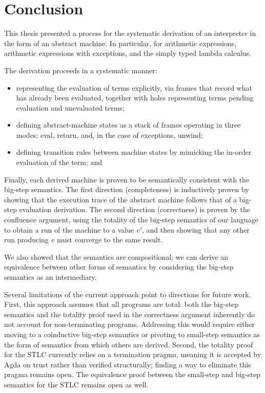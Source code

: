 \chapter{Conclusion} %

This thesis presented a process for the systematic derivation of an interpreter in the form of an abstract machine. In particular, for arithmetic expressions, arithmetic expressions with exceptions, and the simply typed lambda calculus.

The derivation proceeds in a systematic manner:
\begin{itemize}
  \item representing the evaluation of terms explicitly, via frames that record what has already been evaluated, together with holes representing terms pending evaluation and unevaluated terms;
  \item defining abstract-machine states as a stack of frames operating in three modes: eval, return, and, in the case of exceptions, unwind;
  \item defining transition rules between machine states by mimicking the in-order evaluation of the term; and
\end{itemize}
Finally, each derived machine is proven to be semantically consistent with the big-step semantics. 
The first direction (completeness) is inductively proven by showing that the execution trace of the abstract machine follows that of a big-step evaluation derivation.
The second direction (correctness) is proven by the confluence argument, using the totality of the big-step semantics of our language to obtain a run of the machine to a value $v'$, and then showing that any other run producing $v$ must converge to the same result.

We also showed that the semantics are compositional; we can derive an equivalence between other forms of semantics by considering the big-step semantics as an intermediary.

Several limitations of the current approach point to directions for future work.
First, this approach assumes that all programs are total: both the big-step semantics and the totality proof used in the correctness argument inherently do not account for non-terminating programs.
Addressing this would require either moving to a coinductive big-step semantics or pivoting to small-step semantics as the form of semantics from which others are derived.
Second, the totality proof for the STLC currently relies on a termination pragma, meaning it is accepted by Agda on trust rather than verified structurally; finding a way to eliminate this pragma remains open.
The equivalence proof between the small-step and big-step semantics for the STLC remains open as well.

